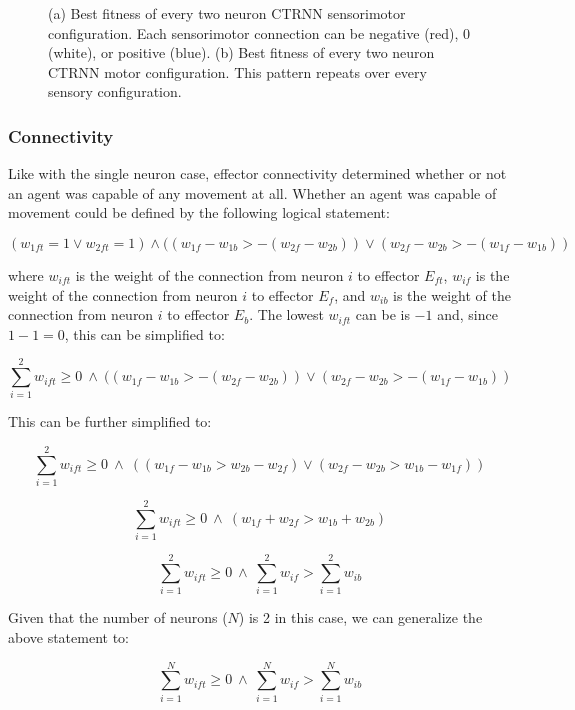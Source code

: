 \documentclass{article}
\begin{document}
\begin{figure}[htbp]
\begin{subfigure}[b]{0.5\textwidth}
    \caption{}
    \label{fig:fitnessPlot2Pattern}
  \end{subfigure}
  \caption{(a) Best fitness of every two neuron CTRNN sensorimotor configuration. Each sensorimotor connection can be negative (red), 0 (white), or positive (blue). (b) Best fitness of every two neuron CTRNN motor configuration. This pattern repeats over every sensory configuration.}
  \label{fig:fitnessPlots2}
\end{figure}

\subsubsection{Connectivity}
Like with the single neuron case, effector connectivity determined whether or not an agent was capable of any movement at all. Whether an agent was capable of movement could be defined by the following logical statement:

\begin{equation}
(w_{1ft} = 1 \vee w_{2ft} = 1)  \wedge ((w_{1f} - w_{1b} > -(w_{2f} - w_{2b})) \vee (w_{2f} - w_{2b} > -(w_{1f} - w_{1b}) )
\end{equation}

where \(w_{ift}\) is the weight of the connection from neuron \(i\) to effector \(E_{ft}\), \(w_{if}\) is the weight of the connection from neuron \(i\) to effector \(E_f\), and \(w_{ib}\) is the weight of the connection from neuron \(i\) to effector \(E_b\). The lowest $w_{ift}$ can be is $-1$ and, since \(1-1=0\), this can be simplified to:

\[\sum_{i=1}^{2} w_{ift} \geq 0 \ \wedge \ ((w_{1f} - w_{1b} > -(w_{2f} - w_{2b})) \vee (w_{2f} - w_{2b} > -(w_{1f} - w_{1b}) )\]

This can be further simplified to:

\[\sum_{i=1}^{2} w_{ift} \geq 0 \ \wedge \ ((w_{1f} - w_{1b} > w_{2b}- w_{2f}) \vee (w_{2f} - w_{2b} > w_{1b} - w_{1f}) )\]

\[\sum_{i=1}^{2} w_{ift} \geq 0 \ \wedge \ (w_{1f} + w_{2f} > w_{1b} + w_{2b}) \]

\[\sum_{i=1}^{2} w_{ift} \geq 0 \ \wedge \ \sum_{i=1}^{2} w_{if} > \sum_{i=1}^{2} w_{ib} \]

Given that the number of neurons ($N$) is 2 in this case, we can generalize the above statement to:

\begin{equation}
  \sum_{i=1}^{N} w_{ift} \geq 0 \ \wedge \ \sum_{i=1}^{N} w_{if} > \sum_{i=1}^{N} w_{ib}
\end{equation}
\end{document}
